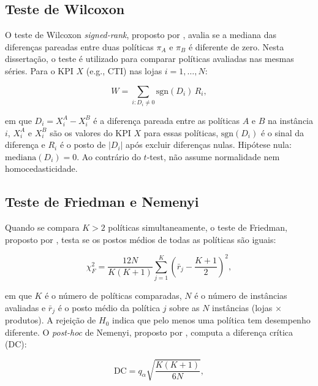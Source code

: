 \subsection{Teste de Wilcoxon}

O teste de Wilcoxon \textit{signed-rank}, proposto por \citet{Wilcoxon1945SignedRank}, avalia se a mediana das diferenças pareadas entre duas políticas $\pi_A$ e $\pi_B$ é diferente de zero. Nesta dissertação, o teste é utilizado para comparar políticas avaliadas nas mesmas séries. Para o KPI $X$ (e.g., CTI) nas lojas $i = 1,\ldots,N$:

\begin{equation}
  W = \sum_{i : D_i \neq 0} \text{sgn}(D_i)\,R_i,
  \label{eq:wilcoxon}
\end{equation}

\noindent em que $D_i = X_i^A - X_i^B$ é a diferença pareada entre as políticas $A$ e $B$ na instância $i$, $X_i^A$ e $X_i^B$ são os valores do KPI $X$ para essas políticas, $\text{sgn}(D_i)$ é o sinal da diferença e $R_i$ é o posto de $|D_i|$ após excluir diferenças nulas. Hipótese nula: $\text{mediana}(D_i) = 0$. Ao contrário do $t$-test, não assume normalidade nem homocedasticidade.

\subsection{Teste de Friedman e Nemenyi}

Quando se compara $K > 2$ políticas simultaneamente, o teste de Friedman, proposto por \citet{Friedman1940Ranks}, testa se os postos médios de todas as políticas são iguais:

\begin{equation}
  \chi_F^2 = \frac{12N}{K(K+1)}\sum_{j=1}^{K}\left(\bar{r}_j - \frac{K+1}{2}\right)^2,
  \label{eq:friedman}
\end{equation}

\noindent em que $K$ é o número de políticas comparadas, $N$ é o número de instâncias avaliadas e $\bar{r}_j$ é o posto médio da política $j$ sobre as $N$ instâncias (lojas $\times$ produtos). A rejeição de $H_0$ indica que pelo menos uma política tem desempenho diferente. O \textit{post-hoc} de Nemenyi, proposto por \citet{Nemenyi1963PostHoc}, computa a diferença crítica (DC):

\begin{equation}
  \text{DC} = q_\alpha \sqrt{\frac{K(K+1)}{6N}},
  \label{eq:cd}
\end{equation}

